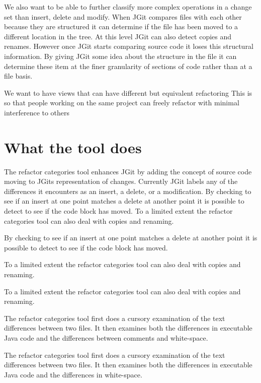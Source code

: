 We also want to be able to further classify more complex operations in a change set than insert, delete and modify.  When JGit compares files with each other because they are structured it can determine if the file has been moved to a different location in the tree.  At this level JGit can also detect copies and renames.  However once JGit starts comparing source code it loses this structural information.  By giving JGit some idea about the structure in the file it can determine these item at the finer granularity of sections of code rather than at a file basis.

We want to have views that can have different but equivalent refactoring
This is so that people working on the same project can freely refactor with minimal interference to others










\section{What the tool does}
The refactor categories tool enhances JGit by adding the concept of source code moving to JGits representation of changes.
Currently JGit labels any of the differences it encounters as an insert, a delete, or a modification.  By checking to see if an insert at one point matches a delete at another point it is possible to detect to see if the code block has moved.
To a limited extent the refactor categories tool can also deal with copies and renaming.

By checking to see if an insert at one point matches a delete at another point it is possible to detect to see if the code block has moved.

To a limited extent the refactor categories tool can also deal with copies and renaming.

To a limited extent the refactor categories tool can also deal with copies and renaming.

The refactor categories tool first does a cursory examination of the text differences between two files. It then examines both the differences in executable Java code and the differences between comments and white-space. 
% 


The refactor categories tool first does a cursory examination of the text differences between two files. It then examines both the differences in executable Java code and the differences in white-space.


